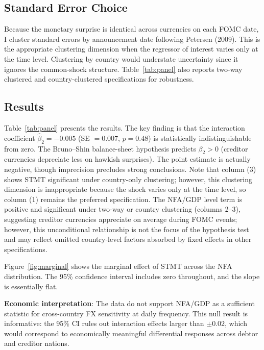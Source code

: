 \documentclass[12pt]{article}
\begin{document}
\subsection*{Standard Error Choice}

Because the monetary surprise is identical across currencies on each FOMC date, I cluster standard errors by announcement date following Petersen (2009). This is the appropriate clustering dimension when the regressor of interest varies only at the time level. Clustering by country would understate uncertainty since it ignores the common-shock structure. Table~\ref{tab:panel} also reports two-way clustered and country-clustered specifications for robustness.

\subsection*{Results}

Table~\ref{tab:panel} presents the results. The key finding is that the interaction coefficient $\hat{\beta}_2 = -0.005$ (SE $= 0.007$, $p = 0.48$) is statistically indistinguishable from zero. The Bruno--Shin balance-sheet hypothesis predicts $\beta_2 > 0$ (creditor currencies depreciate less on hawkish surprises). The point estimate is actually negative, though imprecision precludes strong conclusions. Note that column (3) shows STMT significant under country-only clustering; however, this clustering dimension is inappropriate because the shock varies only at the time level, so column (1) remains the preferred specification. The NFA/GDP level term is positive and significant under two-way or country clustering (columns 2--3), suggesting creditor currencies appreciate on average during FOMC events; however, this unconditional relationship is not the focus of the hypothesis test and may reflect omitted country-level factors absorbed by fixed effects in other specifications.

Figure~\ref{fig:marginal} shows the marginal effect of STMT across the NFA distribution. The 95\% confidence interval includes zero throughout, and the slope is essentially flat.

\textbf{Economic interpretation}: The data do not support NFA/GDP as a sufficient statistic for cross-country FX sensitivity at daily frequency. This null result is informative: the 95\% CI rules out interaction effects larger than $\pm 0.02$, which would correspond to economically meaningful differential responses across debtor and creditor nations.
\end{document}
